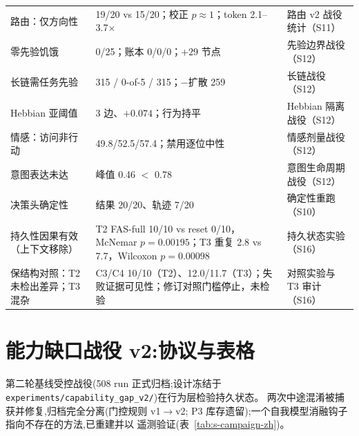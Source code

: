 \documentclass[10pt,a4paper]{ctexart}
\begin{document}
\begin{table}[h]
\begin{tabular}{L{4.6cm}L{4.6cm}L{5.6cm}}
路由：仅方向性 & 19/20 vs 15/20；校正 $p{\approx}1$；token 2.1--3.7$\times$ & 路由 v2 战役统计（S11） \\
零先验饥饿 & 0/25；账本 0/0/0；$+29$ 节点 & 先验边界战役（S12） \\
长链需任务先验 & 315 / 0-of-5 / 315；$-$扩散 259 & 长链战役（S12） \\
Hebbian 亚阈值 & 3 边、$+0.074$；行为持平 & Hebbian 隔离战役（S12） \\
情感：访问非行动 & 49.8/52.5/57.4；禁用逐位中性 & 情感剂量战役（S12） \\
意图表达未达 & 峰值 0.46 $<$ 0.78 & 意图生命周期战役（S12） \\
决策头确定性 & 结果 20/20、轨迹 7/20 & 确定性重跑（S10） \\
持久性因果有效（上下文移除） & T2 FAS-full 10/10 vs reset 0/10，McNemar $p{=}0.00195$；T3 重复 2.8 vs 7.7，Wilcoxon $p{=}0.00098$ & 持久状态实验（S16） \\
保结构对照：T2 未检出差异；T3 混杂 & C3/C4 10/10（T2）、12.0/11.7（T3）；失败证据可见性；修订对照门槛停止，未检验 & 对照实验与 T3 审计（S16） \\
\bottomrule
\end{tabular}
\end{table}


\section{能力缺口战役 v2:协议与表格}
\label{s15:campaign}

第二轮基线受控战役(508 run 正式归档;设计冻结于
\texttt{experiments/capability\_gap\_v2/})在行为层检验持久状态。
两次中途混淆被捕获并修复,归档完全分离(门控规则 v1$\rightarrow$v2;
P3 库存遗留);一个自我模型消融钩子指向不存在的方法,已重建并以
遥测验证(表~\ref{tab:s-campaign-zh})。
\end{document}
